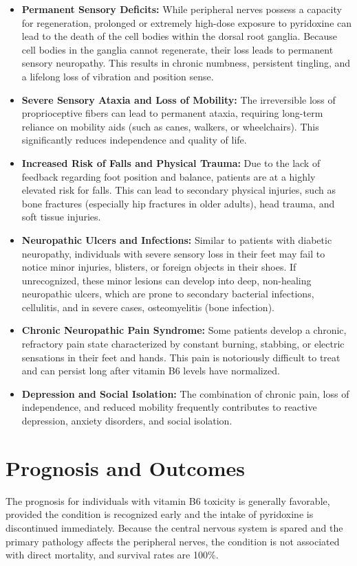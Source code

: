 \begin{itemize}
    \item \textbf{Permanent Sensory Deficits:} While peripheral nerves possess a capacity for regeneration, prolonged or extremely high-dose exposure to pyridoxine can lead to the death of the cell bodies within the dorsal root ganglia. Because cell bodies in the ganglia cannot regenerate, their loss leads to permanent sensory neuropathy. This results in chronic numbness, persistent tingling, and a lifelong loss of vibration and position sense.
    \item \textbf{Severe Sensory Ataxia and Loss of Mobility:} The irreversible loss of proprioceptive fibers can lead to permanent ataxia, requiring long-term reliance on mobility aids (such as canes, walkers, or wheelchairs). This significantly reduces independence and quality of life.
    \item \textbf{Increased Risk of Falls and Physical Trauma:} Due to the lack of feedback regarding foot position and balance, patients are at a highly elevated risk for falls. This can lead to secondary physical injuries, such as bone fractures (especially hip fractures in older adults), head trauma, and soft tissue injuries.
    \item \textbf{Neuropathic Ulcers and Infections:} Similar to patients with diabetic neuropathy, individuals with severe sensory loss in their feet may fail to notice minor injuries, blisters, or foreign objects in their shoes. If unrecognized, these minor lesions can develop into deep, non-healing neuropathic ulcers, which are prone to secondary bacterial infections, cellulitis, and in severe cases, osteomyelitis (bone infection).
    \item \textbf{Chronic Neuropathic Pain Syndrome:} Some patients develop a chronic, refractory pain state characterized by constant burning, stabbing, or electric sensations in their feet and hands. This pain is notoriously difficult to treat and can persist long after vitamin B6 levels have normalized.
    \item \textbf{Depression and Social Isolation:} The combination of chronic pain, loss of independence, and reduced mobility frequently contributes to reactive depression, anxiety disorders, and social isolation.
\end{itemize}

\section*{Prognosis and Outcomes}
The prognosis for individuals with vitamin B6 toxicity is generally favorable, provided the condition is recognized early and the intake of pyridoxine is discontinued immediately. Because the central nervous system is spared and the primary pathology affects the peripheral nerves, the condition is not associated with direct mortality, and survival rates are 100\%.

